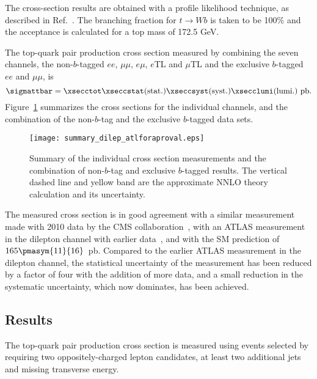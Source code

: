 The cross-section results are obtained with a profile likelihood
technique, as described in Ref.~\cite{ATL-CONF-2011-034}. The
branching fraction for $t\rightarrow Wb$ is taken to be 100\% and
the acceptance is calculated for a top mass of 172.5 GeV.

The top-quark pair production cross section measured by combining
the seven channels, the non-$b$-tagged $ee$, $\mu\mu$, $e\mu$, $e$TL
and $\mu$TL and the exclusive $b$-tagged $ee$ and $\mu\mu$, is
\[
\sigmattbar=\mathrm{}\xsecctot \xseccstat
\mathrm{(stat.)}\xseccsyst \mathrm{(syst.)} \xsecclumi
\mathrm{(lumi.)}~\rm pb.
\]
Figure~\ref{fig:XsecSummary} summarizes the cross sections
for the individual channels,  and the combination of the non-$b$-tag and
the exclusive $b$-tagged data sets.

\begin{figure}[!h]
\centering
\texttt{[image: summary\_dilep\_atlforaproval.eps]}
    \caption{Summary of the individual cross section measurements and the combination of non-$b$-tag and
    exclusive $b$-tagged results. The vertical dashed line and yellow band are the approximate NNLO theory calculation and its uncertainty.}
    \label{fig:XsecSummary}
\end{figure}

The measured cross section is in good agreement with a similar
measurement made with 2010 data by the CMS
collaboration~\cite{Chatrchyan:2011nb}, %
with an ATLAS measurement in the dilepton channel with earlier
data~\cite{ATL-CONF-2011-034}, and with the SM
prediction of
$165\pmasym{11}{16}$~pb. Compared to the earlier ATLAS measurement
in the dilepton channel, the statistical uncertainty of the
measurement has been reduced by a factor of four with the addition
of more data, and a small reduction in the systematic uncertainty,
which now dominates, has been achieved.



\subsection{Results}
\label{s:summary}


The top-quark pair production cross section is measured using  events
selected by requiring two oppositely-charged lepton candidates, at least two
additional jets and missing transverse energy.

